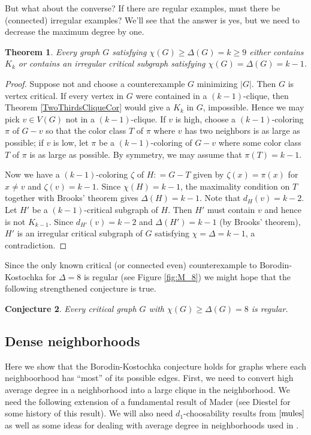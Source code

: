 \documentclass[12pt]{article}
\theoremstyle{plain}
\newtheorem{thm}{Theorem}[section]
\newtheorem{conjecture}[thm]{Conjecture}
\theoremstyle{definition}
\theoremstyle{remark}
\newcommand{\card}[1]{\left|#1\right|}
\newcommand{\DefinedAs}{\mathrel{\mathop:}=}
\begin{document}
But what about the converse?  If there are regular examples, must there be
(connected) irregular examples?  We'll see that the answer is yes, but we need
to decrease the maximum degree by one.

\begin{thm}\label{IrregularReduction}
Every graph $G$ satisfying $\chi(G) \geq \Delta(G) = k \geq 9$ either
contains $K_k$ or contains an irregular critical subgraph satisfying $\chi(G)
= \Delta(G) = k - 1$.
\end{thm}
\begin{proof}
Suppose not and choose a counterexample $G$ minimizing $\card{G}$. Then $G$ is
vertex critical. If every vertex in $G$ were contained in a $(k-1)$-clique, 
then Theorem \ref{TwoThirdsCliqueCor} would give a $K_k$ in $G$, impossible. 
Hence we may pick $v \in V(G)$ not in a $(k-1)$-clique. If $v$ is high, choose a
$(k-1)$-coloring $\pi$ of $G-v$ so that the color class $T$ of $\pi$
where $v$ has two neighbors is as large as possible; if $v$ is low, let $\pi$ be a
$(k-1)$-coloring of $G-v$ where some color class $T$ of $\pi$ is as large as
possible.  By symmetry, we may assume that $\pi(T) = k-1$.  

Now we have a $(k-1)$-coloring $\zeta$ of $H \DefinedAs G-T$ given by $\zeta(x)
= \pi(x)$ for $x \neq v$ and $\zeta(v) = k-1$.  Since $\chi(H) = k - 1$, the
maximality condition on $T$ together with Brooks' theorem gives $\Delta(H) =
k - 1$.  Note that $d_H(v) = k - 2$.  Let $H'$ be a $(k-1)$-critical subgraph of
$H$.  Then $H'$ must contain $v$ and hence is not $K_{k-1}$.  Since $d_{H'}(v) =
k-2$ and $\Delta(H') = k - 1$ (by Brooks' theorem), $H'$ is an irregular
critical subgraph of $G$ satisfying $\chi = \Delta = k - 1$, a contradiction.
\end{proof}



Since the only known critical (or connected even) counterexample to
Borodin-Kostochka for $\Delta = 8$ is regular (see Figure \ref{fig:M_8}) we
might hope that the following strengthened conjecture is true.

\begin{conjecture}\label{EightRegular}
Every critical graph $G$ with $\chi(G) \geq \Delta(G) = 8$ is regular.
\end{conjecture}

\subsection{Dense neighborhoods}
Here we show that the Borodin-Kostochka conjecture holds for graphs where each neighboorhood has ``most'' of its possible edges.  First, we need to convert high average degree in a neighborhood into a large clique in the neighborhood. We need the following extension of a fundamental result of Mader \cite{mader} (see Diestel \cite{diestel2010} for some history of this result).  We will also need $d_1$-choosability results from $\cite{mules}$ as well as some ideas for dealing with average degree in neighborhoods used in \cite{cranstonrabernclaw}.
\end{document}

